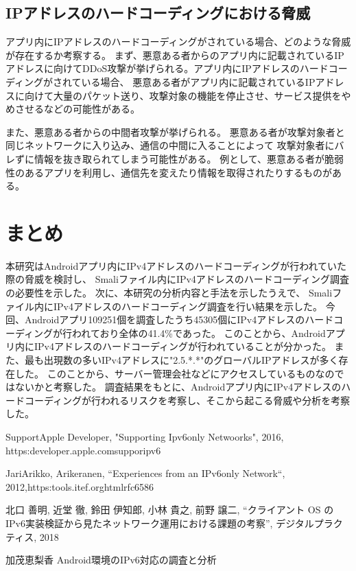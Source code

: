 \documentclass[a4j]{jarticle}
\begin{document}
\subsection{IPアドレスのハードコーディングにおける脅威}
アプリ内にIPアドレスのハードコーディングがされている場合、どのような脅威が存在するか考察する。
まず、悪意ある者からのアプリ内に記載されているIPアドレスに向けてDDoS攻撃が挙げられる。アプリ内にIPアドレスのハードコーディングがされている場合、
悪意ある者がアプリ内に記載されているIPアドレスに向けて大量のパケット送り、攻撃対象の機能を停止させ、サービス提供をやめさせるなどの可能性がある。

また、悪意ある者からの中間者攻撃が挙げられる。
悪意ある者が攻撃対象者と同じネットワークに入り込み、通信の中間に入ることによって
攻撃対象者にバレずに情報を抜き取られてしまう可能性がある。
例として、悪意ある者が脆弱性のあるアプリを利用し、通信先を変えたり情報を取得されたりするものがある。
\newpage
\section{まとめ}
本研究はAndroidアプリ内にIPv4アドレスのハードコーディングが行われていた際の脅威を検討し、
Smaliファイル内にIPv4アドレスのハードコーディング調査の必要性を示した。
次に、本研究の分析内容と手法を示したうえで、
Smaliファイル内にIPv4アドレスのハードコーディング調査を行い結果を示した。
今回、Androidアプリ109251個を調査したうち45305個にIPv4アドレスのハードコーディングが行われており全体の41.4\%であった。
このことから、Androidアプリ内にIPv4アドレスのハードコーディングが行われていることが分かった。
また、最も出現数の多いIPv4アドレスに"2.5.*.*"のグローバルIPアドレスが多く存在した。
このことから、サーバー管理会社などにアクセスしているものなのではないかと考察した。
調査結果をもとに、Androidアプリ内にIPv4アドレスのハードコーディングが行われるリスクを考察し、そこから起こる脅威や分析を考察した。
\newpage
\begin{thebibliography}{99}

Support\-Apple Developer, "Supporting Ipv6\-only Netwoorks", 2016, https:\/\/developer.apple.com\/suppor\/ipv6

JariArikko, Arikeranen, “Experiences from an IPv6\-only Network“, 2012,https:\/\/tools.itef.org\/html\/rfc6586

北口 善明, 近堂 徹, 鈴田 伊知郎, 小林 貴之, 前野 譲二, “クライアント OS の IPv6実装検証から見たネットワーク運用における課題の考察”, デジタルプラクティス, 2018

加茂恵梨香 Android環境のIPv6対応の調査と分析
\end{thebibliography}
\end{document}
